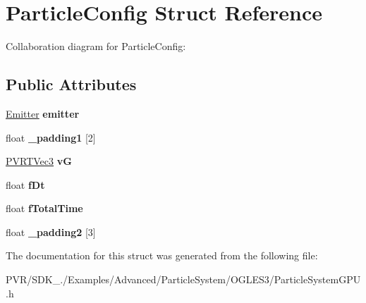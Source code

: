 \hypertarget{struct_particle_config}{\section{Particle\+Config Struct Reference}
\label{struct_particle_config}
}


Collaboration diagram for Particle\+Config\+:
\subsection*{Public Attributes}
\begin{DoxyCompactItemize}
\item 
\hypertarget{struct_particle_config_a013ffc4c5e47a9631b4b41021c73a88f}{\hyperlink{struct_emitter}{Emitter} {\bfseries emitter}}\label{struct_particle_config_a013ffc4c5e47a9631b4b41021c73a88f}

\item 
\hypertarget{struct_particle_config_a4fd9e8d5d257c768fe3431dd795f5049}{float {\bfseries \+\_\+padding1} \mbox{[}2\mbox{]}}\label{struct_particle_config_a4fd9e8d5d257c768fe3431dd795f5049}

\item 
\hypertarget{struct_particle_config_a9b9beefa3deb29354a7108e583204c67}{\hyperlink{struct_p_v_r_t_vec3}{P\+V\+R\+T\+Vec3} {\bfseries v\+G}}\label{struct_particle_config_a9b9beefa3deb29354a7108e583204c67}

\item 
\hypertarget{struct_particle_config_a64ac8997a8a0f641c7ac9abf6c520b9f}{float {\bfseries f\+Dt}}\label{struct_particle_config_a64ac8997a8a0f641c7ac9abf6c520b9f}

\item 
\hypertarget{struct_particle_config_a0e440f9ffab324ebabf79b95a4e141a2}{float {\bfseries f\+Total\+Time}}\label{struct_particle_config_a0e440f9ffab324ebabf79b95a4e141a2}

\item 
\hypertarget{struct_particle_config_a8266a03805c0a489ea2b9358905fac65}{float {\bfseries \+\_\+padding2} \mbox{[}3\mbox{]}}\label{struct_particle_config_a8266a03805c0a489ea2b9358905fac65}

\end{DoxyCompactItemize}


The documentation for this struct was generated from the following file\+:\begin{DoxyCompactItemize}
\item 
P\+V\+R/\+S\+D\+K\+\_./\+Examples/\+Advanced/\+Particle\+System/\+O\+G\+L\+E\+S3/Particle\+System\+G\+P\+U.\+h\end{DoxyCompactItemize}
